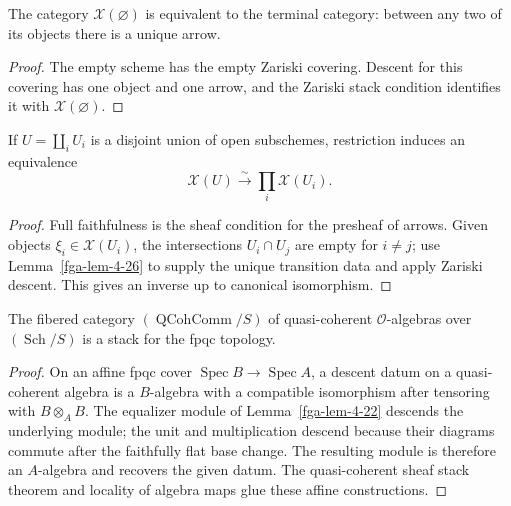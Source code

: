 \begin{lemma}\label{fga-lem-4-26}
The category $\mathcal X(\varnothing)$ is equivalent to the terminal category:
between any two of its objects there is a unique arrow.
\end{lemma}
\begin{proof}
The empty scheme has the empty Zariski covering.  Descent for this covering has
one object and one arrow, and the Zariski stack condition identifies it with
$\mathcal X(\varnothing)$.
\end{proof}

\begin{lemma}\label{fga-lem-4-27}
If $U=\coprod_iU_i$ is a disjoint union of open subschemes, restriction induces
an equivalence
\[
\mathcal X(U)\xrightarrow{\sim}\prod_i\mathcal X(U_i).
\]
\end{lemma}
\begin{proof}
Full faithfulness is the sheaf condition for the presheaf of arrows.  Given
objects $\xi_i\in\mathcal X(U_i)$, the intersections $U_i\cap U_j$ are empty
for $i\ne j$; use Lemma~\ref{fga-lem-4-26} to supply the unique transition data
and apply Zariski descent.  This gives an inverse up to canonical isomorphism.
\end{proof}

\begin{theorem}\label{fga-the-4-29}
The fibered category $(\operatorname{QCohComm}/S)$ of quasi-coherent
$\mathcal O$-algebras over $(\operatorname{Sch}/S)$ is a stack for the fpqc
topology.
\end{theorem}
\begin{proof}
On an affine fpqc cover $\operatorname{Spec}B\to\operatorname{Spec}A$, a
descent datum on a quasi-coherent algebra is a $B$-algebra with a compatible
isomorphism after tensoring with $B\otimes_AB$.  The equalizer module of
Lemma~\ref{fga-lem-4-22} descends the underlying module; the unit and
multiplication descend because their diagrams commute after the faithfully flat
base change.  The resulting module is therefore an $A$-algebra and recovers the
given datum.  The quasi-coherent sheaf stack theorem and locality of algebra
maps glue these affine constructions.
\end{proof}

